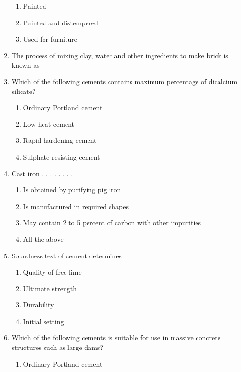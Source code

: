 \documentclass[11pt,a4paper]{article}
\begin{document}
\begin{enumerate}
\begin{enumerate}[label=\Alph*.]
\item{Painted}
\item{Painted and distempered}
\item{Used for furniture}
\end{enumerate}
\item{The process of mixing clay, water and other ingredients to make brick is known as}
\\
\item{Which of the following cements contains maximum percentage of dicalcium silicate?}
\begin{enumerate}[label=\Alph*.]
\item{Ordinary Portland cement}
\item{Low heat cement}
\item{Rapid hardening cement}
\item{Sulphate resisting cement}
\end{enumerate}
\item{Cast iron . . . . . . . .}
\begin{enumerate}[label=\Alph*.]
\item{Is obtained by purifying pig iron}
\item{Is manufactured in required shapes}
\item{May contain 2 to 5 percent of carbon with other impurities}
\item{All the above}
\end{enumerate}
\item{Soundness test of cement determines}
\begin{enumerate}[label=\Alph*.]
\item{Quality of free lime}
\item{Ultimate strength}
\item{Durability}
\item{Initial setting}
\end{enumerate}
\item{Which of the following cements is suitable for use in massive concrete structures such as large dams?}
\begin{enumerate}[label=\Alph*.]
\item{Ordinary Portland cement}

\end{enumerate}
\end{enumerate}
\end{document}
